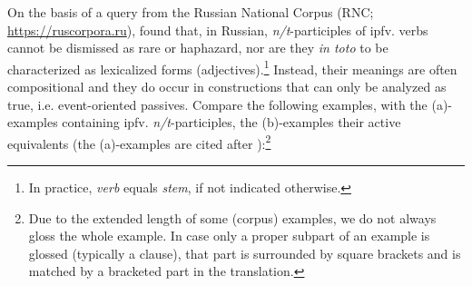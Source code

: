 \documentclass[output=paper]{langscibook}
\begin{document}
\begin{sloppypar}
On the basis of a query from the Russian National Corpus (RNC; \url{https://ruscorpora.ru}), \citet{Borik.Gehrke2018} found that, in Russian, \textit{n/t}-participles of ipfv. verbs cannot be dismissed as rare or haphazard, nor are they \textit{in toto} to be characterized as lexicalized forms (adjectives).\footnote{In practice, \textit{verb} equals \textit{stem}, if not indicated otherwise.} Instead, their meanings are often compositional and they do occur in constructions that can only be analyzed as true, i.e. event-oriented passives. Compare the following examples, with the (a)-examples containing ipfv. \textit{n/t}-participles, the (b)-examples their active equivalents (the (a)-examples are cited after \citealt[pp. 61, 66, 65 respectively]{Borik.Gehrke2018}):\footnote{Due to the extended length of some (corpus) examples, we do not always gloss the whole example. In case only a proper subpart of an example is glossed (typically a clause), that part is surrounded by square brackets and is matched by a bracketed part in the translation.}
\end{sloppypar}

\ea\label{wiem:ex:strich}

\z
\ex\label{wiem:ex:uchit}

\z
\ex\label{wiem:ex:pisat}
\end{document}

